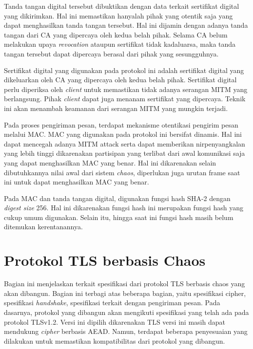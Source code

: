 Tanda tangan digital tersebut dibuktikan dengan data terkait sertifikat digital yang dikirimkan. Hal ini memastikan hanyalah pihak yang otentik saja yang dapat menghasilkan tanda tangan tersebut. Hal ini dijamin dengan adanya tanda tangan dari CA yang dipercaya oleh kedua belah pihak. Selama CA belum melakukan upaya \emph{revocation} ataupun sertifikat tidak kadaluarsa, maka tanda tangan tersebut dapat dipercaya berasal dari pihak yang sesungguhnya.

Sertifikat digital yang digunakan pada protokol ini adalah sertifikat digital yang dikeluarkan oleh CA yang dipercaya oleh kedua belah pihak. Sertifikat digital perlu diperiksa oleh \emph{client} untuk memastikan tidak adanya serangan MITM yang berlangsung. Pihak \emph{client} dapat juga menanam sertifikat yang dipercaya. Teknik ini akan menambah keamanan dari serangan MITM yang mungkin terjadi. 

Pada proses pengiriman pesan, terdapat mekanisme otentikasi pengirim pesan melalui MAC. MAC yang digunakan pada protokol ini bersifat dinamis. Hal ini dapat mencegah adanya MITM attack serta dapat memberikan nirpenyangkalan yang lebih tinggi dikarenakan partisipan yang terlibat dari awal komunikasi saja yang dapat menghasilkan MAC yang benar. Hal ini dikarenakan selain dibutuhkannya nilai awal dari sistem \emph{chaos}, diperlukan juga urutan frame saat ini untuk dapat menghasilkan MAC yang benar.

Pada MAC dan tanda tangan digital, digunakan fungsi hash SHA-2 dengan \emph{digest size} 256. Hal ini dikarenakan fungsi hash ini merupakan fungsi hash yang cukup umum digunakan. Selain itu, hingga saat ini fungsi hash masih belum ditemukan kerentanannya.

\section{Protokol TLS berbasis Chaos} \label{sec:protokol-tls-chaos}

Bagian ini menjelaskan terkait spesifikasi dari protokol TLS berbasis chaos yang akan dibangun. Bagian ini terbagi atas beberapa bagian, yaitu spesifikasi cipher, spesifikasi \emph{handshake}, spesifikasi terkait dengan pengiriman pesan. Pada dasarnya, protokol yang dibangun akan mengikuti spesifikasi yang telah ada pada protokol TLSv1.2. Versi ini dipilih dikarenakan TLS versi ini masih dapat mendukung \emph{cipher} berbasis AEAD. Namun, terdapat beberapa penyesuaian yang dilakukan untuk memastikan kompatibilitas dari protokol yang dibangun.

